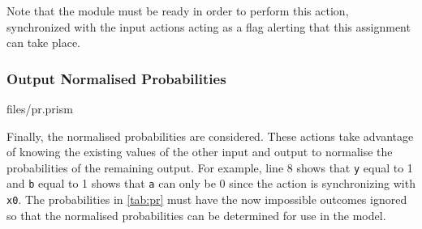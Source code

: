 \documentclass[report.tex]{subfiles}
\begin{document}
Note that the module must be ready in order to perform this action, synchronized
with the input actions acting as a flag alerting that this assignment can take
place.

\subsubsection{Output Normalised Probabilities} %
\label{ssub:output_normalised_probabilities}

{files/pr.prism} 

Finally, the normalised probabilities are considered. These actions take
advantage of knowing the existing values of the other input and output to
normalise the probabilities of the remaining output. For example, line 8 shows
that \texttt{y} equal to 1 and \texttt{b} equal to 1 shows that \texttt{a} can
only be 0 since the action is synchronizing with \texttt{x0}. The probabilities
in \ref{tab:pr} must have the now impossible outcomes ignored so that the
normalised probabilities can be determined for use in the model.


\newpage
\end{document}
